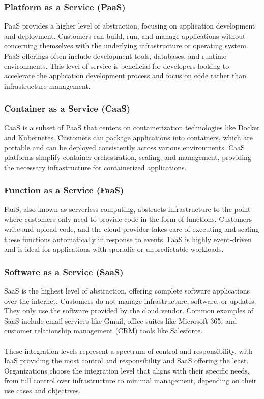 \subsubsection{Platform as a Service (PaaS)}
PaaS provides a higher level of abstraction, focusing on application development and deployment.
Customers can build, run, and manage applications without concerning themselves with the underlying infrastructure or operating system.
PaaS offerings often include development tools, databases, and runtime environments.
This level of service is beneficial for developers looking to accelerate the application development process and focus on code rather than infrastructure management.

\subsubsection{Container as a Service (CaaS)}
CaaS is a subset of PaaS that centers on containerization technologies like Docker and Kubernetes.
Customers can package applications into containers, which are portable and can be deployed consistently across various environments.
CaaS platforms simplify container orchestration, scaling, and management, providing the necessary infrastructure for containerized applications.

\subsubsection{Function as a Service (FaaS)}
FaaS, also known as serverless computing, abstracts infrastructure to the point where customers only need to provide code in the form of functions.
Customers write and upload code, and the cloud provider takes care of executing and scaling these functions automatically in response to events.
FaaS is highly event-driven and is ideal for applications with sporadic or unpredictable workloads.

\subsubsection{Software as a Service (SaaS)}
SaaS is the highest level of abstraction, offering complete software applications over the internet.
Customers do not manage infrastructure, software, or updates. They only use the software provided by the cloud vendor.
Common examples of SaaS include email services like Gmail, office suites like Microsoft 365, and customer relationship management (CRM) tools like Salesforce.
\\\\
These integration levels represent a spectrum of control and responsibility, 
with IaaS providing the most control and responsibility and SaaS offering the least. Organizations choose the integration level that aligns with their specific needs, from full control over infrastructure to minimal management, depending on their use cases and objectives.

